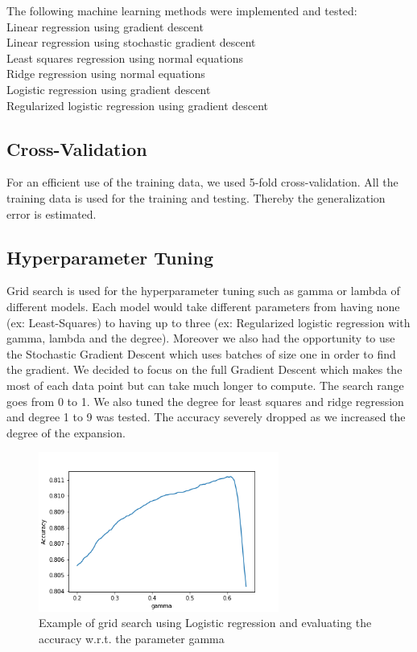 \documentclass[10pt,conference,compsocconf]{IEEEtran}
\begin{document}
The following machine learning methods were implemented and tested:\\
Linear regression using gradient descent\\
Linear regression using stochastic gradient descent\\
Least squares regression using normal equations\\
Ridge regression using normal equations\\
Logistic regression using gradient descent\\
Regularized logistic regression using gradient descent\\




\subsection{Cross-Validation}
For an efficient use of the training data, we used 5-fold cross-validation. All the training data is used for the training and testing. Thereby the generalization error is estimated.

\subsection{Hyperparameter Tuning}
Grid search is used for the hyperparameter tuning such as gamma or lambda of different models. Each model would take different parameters from having none (ex: Least-Squares) to having up to three (ex: Regularized logistic regression with gamma, lambda and the degree). Moreover we also had the opportunity to use the Stochastic Gradient Descent which uses batches of size one in order to find the gradient. We decided to focus on the full Gradient Descent which makes the most of each data point but can take much longer to compute. The search range goes from 0 to 1. We also tuned the degree for least squares and ridge regression and degree 1 to 9 was tested. The accuracy severely dropped as we increased the degree of the expansion.
\begin{figure}[h]
  \centering
  \includegraphics[width=3.1in]{graph.png}
  \caption{Example of grid search using Logistic regression and evaluating the accuracy w.r.t. the parameter gamma}
  \label{fig:pca}
\end{figure}
\end{document}
